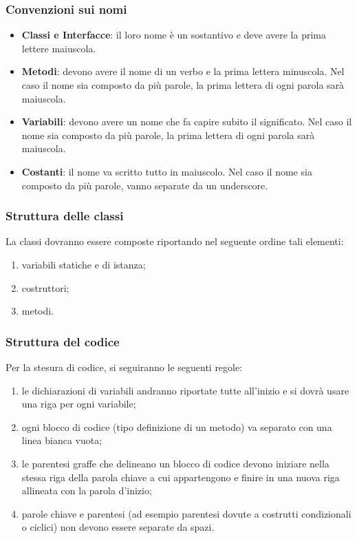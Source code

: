 {\subsubsection{Convenzioni sui nomi}
\begin{itemize}
\item \textbf{Classi e Interfacce}: il loro nome è un sostantivo e deve avere la prima lettere maiuscola.
\item \textbf{Metodi}: devono avere il nome di un verbo e la prima lettera minuscola. Nel caso il nome sia composto da più parole, la prima lettera di ogni parola sarà maiuscola.
\item \textbf{Variabili}: devono avere un nome che fa capire subito il significato. Nel caso il nome sia composto da più parole, la prima lettera di ogni parola sarà maiuscola.
\item \textbf{Costanti}: il nome va scritto tutto in maiuscolo. Nel caso il nome sia composto da più parole, vanno separate da un underscore.

\end{itemize}

\subsubsection{Struttura delle classi}
La classi dovranno essere composte riportando nel seguente ordine tali elementi:
\begin{enumerate}
\item variabili statiche e di istanza;
\item costruttori;
\item metodi.
\end{enumerate}

\subsubsection{Struttura del codice}
Per la stesura di codice, si seguiranno le seguenti regole:
\begin{enumerate}
\item le dichiarazioni di variabili andranno riportate tutte all'inizio e si dovrà usare una riga per ogni variabile;
\item ogni blocco di codice (tipo definizione di un metodo) va separato  con una linea bianca vuota;
\item le parentesi graffe che delineano un blocco di codice devono iniziare nella stessa riga della parola chiave a cui appartengono e finire in una nuova riga allineata con la parola d'inizio;
\item parole chiave e parentesi (ad esempio parentesi dovute a costrutti condizionali o ciclici) non devono essere separate da spazi.
\end{enumerate}

}
